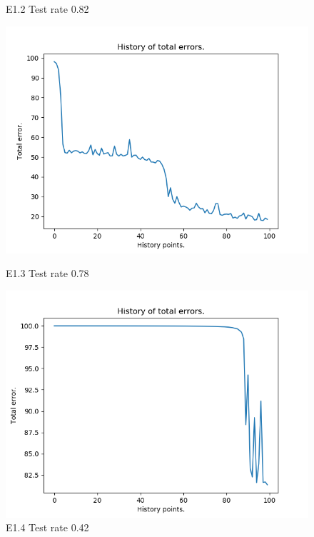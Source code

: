 \documentclass{classrep}
\begin{document}
\begin{figure}[H]
\begin{minipage}{0.5\linewidth}
				\caption{E1.2 Test rate  0.82}
				\label{E1.2}
			\end{minipage}
			\begin{minipage}{0.5\linewidth}
				\centering
				\includegraphics[scale=0.25]{iris_nn_s12.png}
				\caption{E1.3 Test rate  0.78}
			\end{minipage}
			\begin{minipage}{0.5\linewidth}
				\centering
				\includegraphics[scale=0.25]{iris_nn_s20.png}
				\caption{E1.4 Test rate  0.42}
			\end{minipage}
		\end{figure}
		\FloatBarrier
\end{document}
